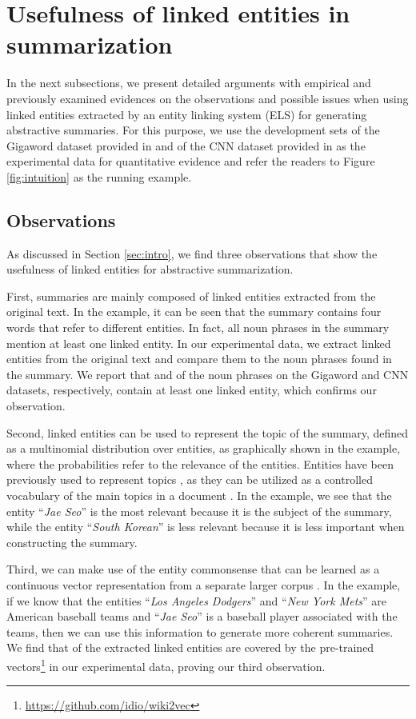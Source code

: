 \documentclass[11pt,a4paper]{article}
\begin{document}
\section{Usefulness of linked entities in summarization}
\label{sec:ent4sum}

In the next subsections, we present detailed arguments with empirical and previously examined evidences on the observations and possible issues when using linked entities extracted by an entity linking system (ELS) for generating abstractive summaries. For this purpose, we use the development sets of the Gigaword dataset provided in \cite{rush2015neural} and of the CNN dataset provided in \cite{hermann2015teaching} as the experimental data for quantitative evidence and refer the readers to Figure \ref{fig:intuition} as the running example.

\subsection{Observations}

As discussed in Section \ref{sec:intro}, we find three observations that show the usefulness of linked entities for abstractive summarization.

First, summaries are mainly composed of linked entities extracted from the original text. In the example, it can be seen that the summary contains four words that refer to different entities.
In fact, all noun phrases in the summary mention at least one linked entity. In our experimental data, we extract linked entities from the original text and compare them to the noun phrases found in the summary. We report that  and  of the noun phrases on the Gigaword and CNN datasets, respectively, contain at least one linked entity, which confirms our observation.

Second, linked entities can be used to represent the topic of the summary,
defined as a multinomial distribution over entities, as graphically shown in the example, where the probabilities refer to the relevance of the entities. Entities have been previously used to represent topics
\cite{newman2006analyzing}, as they can be utilized as a controlled vocabulary of the main topics in a document \cite{hulpus2013unsupervised}. 
In the example, we see that the entity ``\textit{Jae Seo}'' is the most relevant because it is the subject of the summary, while the entity ``\textit{South Korean}'' is less relevant because it is less important when constructing the summary.

Third, we can make use of the entity commonsense that can be learned as a continuous vector representation from a separate larger corpus \cite{ni2016semantic,yamada2017learning}. In the example, if we know that the entities ``\textit{Los Angeles Dodgers}'' and ``\textit{New York Mets}'' are American baseball teams and ``\textit{Jae Seo}'' is a baseball player associated with the teams, then we can use this information to generate more coherent summaries. 
We find that  of the extracted linked entities are covered by the pre-trained vectors\footnote{\url{https://github.com/idio/wiki2vec}} in our experimental data, proving our third observation.
\end{document}
